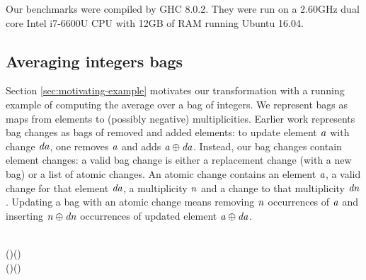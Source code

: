 Our benchmarks were compiled by GHC 8.0.2. They were run on a 2.60GHz dual core
Intel i7-6600U CPU with 12GB of RAM running Ubuntu 16.04.

\subsection{Averaging integers bags}
\label{sec:incr-an-aver}

Section \cref{sec:motivating-example} motivates our transformation with a
running example of computing the average over a bag of integers.
We represent bags as maps from elements to (possibly negative) multiplicities.
Earlier work \citep{CaiEtAl2014ILC,Koch14} represents bag changes as bags
of removed and added elements: to update element \ensuremath{\Varid{a}} with change \ensuremath{\Varid{da}}, one removes
\ensuremath{\Varid{a}} and adds \ensuremath{\Varid{a}\oplus \Varid{da}}. Instead, our bag changes contain element changes: a
valid bag change is either a replacement change (with a new bag) or a list of atomic
changes.
An atomic change contains an element \ensuremath{\Varid{a}}, a valid change for that element
\ensuremath{\Varid{da}}, a multiplicity \ensuremath{\Varid{n}} and a change to that multiplicity \ensuremath{\Varid{dn}}. Updating a bag
with an atomic change means removing \ensuremath{\Varid{n}} occurrences of \ensuremath{\Varid{a}} and
inserting \ensuremath{\Varid{n}\oplus \Varid{dn}} occurrences of updated element \ensuremath{\Varid{a}\oplus \Varid{da}}.

\begin{hscode}\SaveRestoreHook
{}%
%
\>[B]{}\;\;\mathrel{=}\;\;\<[E]%
\\
\>[B]{}\;\Delta (\;)\mathrel{=}\;(\;)\mid {}\<[E]%
\\
\>[B]{}\;\;\mathrel{=}\;\;(\Delta {})\;\;(\Delta {}){}\<[E]%
\ColumnHook
\end{hscode}\resethooks

